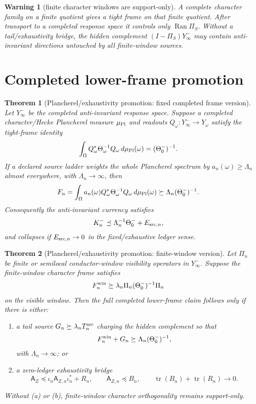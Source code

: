 \documentclass[11pt]{article}
\newtheorem{theorem}{Theorem}
\newtheorem{warning}{Warning}
\newcommand{\tr}{\operatorname{tr}}
\newcommand{\Ran}{\operatorname{Ran}}
\begin{document}
\begin{warning}[finite character windows are support-only]
A complete character family on a finite quotient gives a tight frame on that finite quotient.  After transport to a completed response space it controls only \(\Ran\Pi_S\).  Without a tail/exhaustivity bridge, the hidden complement \((I-\Pi_S)Y_\infty^-\) may contain anti-invariant directions untouched by all finite-window sources.
\end{warning}

\section{Completed lower-frame promotion}
\begin{theorem}[Plancherel/exhaustivity promotion: fixed completed frame version]
Let \(Y_\infty^-\) be the completed anti-invariant response space.  Suppose a completed character/Hecke Plancherel measure \(\mu_{\rm Pl}\) and readouts \(Q_\omega:Y_\infty^-\to Y_\omega\) satisfy the tight-frame identity
\[
\int_\Omega Q_\omega^*\Theta_\omega^{-1}Q_\omega\,d\mu_{\rm Pl}(\omega)
=
(\Theta_0^-)^{-1}.
\]
If a declared source ladder weights the whole Plancherel spectrum by \(a_n(\omega)\ge \Lambda_n\) almost everywhere, with \(\Lambda_n\to\infty\), then
\[
F_n
=
\int_\Omega a_n(\omega)Q_\omega^*\Theta_\omega^{-1}Q_\omega\,d\mu_{\rm Pl}(\omega)
\succeq
\Lambda_n(\Theta_0^-)^{-1}.
\]
Consequently the anti-invariant currency satisfies
\[
K_n^-
\preceq
\Lambda_n^{-1}\Theta_0^-+E_{{\rm src},n},
\]
and collapses if \(E_{{\rm src},n}\to0\) in the fixed/exhaustive ledger sense.
\end{theorem}

\begin{theorem}[Plancherel/exhaustivity promotion: finite-window version]
Let \(\Pi_n\) be finite or semilocal conductor-window visibility operators in \(Y_\infty^-\).  Suppose the finite-window character frame satisfies
\[
F_n^{\rm win}\succeq \lambda_n\Pi_n(\Theta_0^-)^{-1}\Pi_n
\]
on the visible window.  Then the full completed lower-frame claim follows only if there is either:
\begin{enumerate}[label=(\alph*)]
\item a tail source \(G_n\succeq \lambda_n T_n^{\rm src}\) charging the hidden complement so that
\[
F_n^{\rm win}+G_n\succeq\Lambda_n(\Theta_0^-)^{-1},
\]
with \(\Lambda_n\to\infty\); or
\item a zero-ledger exhaustivity bridge
\[
\mathsf A_Z\preceq \iota_n\mathsf A_{Z,n}\iota_n^*+R_n,
\qquad
\mathsf A_{Z,n}\preceq B_n,
\qquad
\tr(B_n)+\tr(R_n)\to0.
\]
\end{enumerate}
Without (a) or (b), finite-window character orthogonality remains support-only.
\end{theorem}
\end{document}
